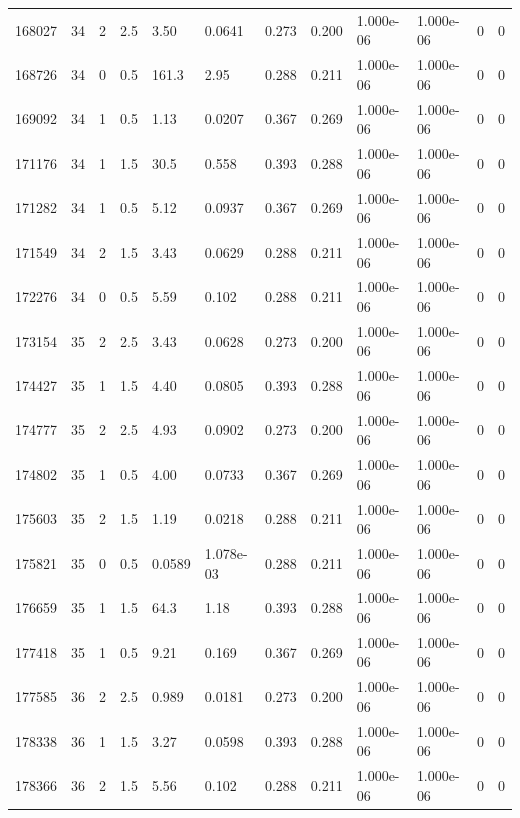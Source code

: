 \documentclass[preview]{standalone}
\begin{document}
{{{{{{{{\begin{tabular}{L{1.2cm}C{1.2cm} C{0.3cm}C{0.5cm} C{1.4cm}C{1.4cm} C{1.4cm}C{1.4cm} C{1.6cm}C{1.6cm} C{1.6cm}C{1.6cm}}
  168027  &    34  & 2     & 2.5 &  3.50  & 0.0641  &  0.273&   0.200& 1.000e-06 & 1.000e-06   &  0 & 0  \\ 
  168726  &    34  & 0     & 0.5 &  161.3  & 2.95  &  0.288&   0.211& 1.000e-06 & 1.000e-06   &  0 & 0  \\ 
  169092  &    34  & 1     & 0.5 &  1.13  & 0.0207  &  0.367&   0.269& 1.000e-06 & 1.000e-06   &  0 & 0  \\ 
  171176  &    34  & 1     & 1.5 &  30.5  & 0.558  &  0.393&   0.288& 1.000e-06 & 1.000e-06   &  0 & 0  \\ 
  171282  &    34  & 1     & 0.5 &  5.12  & 0.0937  &  0.367&   0.269& 1.000e-06 & 1.000e-06   &  0 & 0  \\ 
  171549  &    34  & 2     & 1.5 &  3.43  & 0.0629  &  0.288&   0.211& 1.000e-06 & 1.000e-06   &  0 & 0  \\ 
  172276  &    34  & 0     & 0.5 &  5.59  & 0.102  &  0.288&   0.211& 1.000e-06 & 1.000e-06   &  0 & 0  \\ 
  173154  &    35  & 2     & 2.5 &  3.43  & 0.0628  &  0.273&   0.200& 1.000e-06 & 1.000e-06   &  0 & 0  \\ 
  174427  &    35  & 1     & 1.5 &  4.40  & 0.0805  &  0.393&   0.288& 1.000e-06 & 1.000e-06   &  0 & 0  \\ 
  174777  &    35  & 2     & 2.5 &  4.93  & 0.0902  &  0.273&   0.200& 1.000e-06 & 1.000e-06   &  0 & 0  \\ 
  174802  &    35  & 1     & 0.5 &  4.00  & 0.0733  &  0.367&   0.269& 1.000e-06 & 1.000e-06   &  0 & 0  \\ 
  175603  &    35  & 2     & 1.5 &  1.19  & 0.0218  &  0.288&   0.211& 1.000e-06 & 1.000e-06   &  0 & 0  \\ 
  175821  &    35  & 0     & 0.5 &  0.0589  & 1.078e-03  &  0.288&   0.211& 1.000e-06 & 1.000e-06   &  0 & 0  \\ 
  176659  &    35  & 1     & 1.5 &  64.3  & 1.18  &  0.393&   0.288& 1.000e-06 & 1.000e-06   &  0 & 0  \\ 
  177418  &    35  & 1     & 0.5 &  9.21  & 0.169  &  0.367&   0.269& 1.000e-06 & 1.000e-06   &  0 & 0  \\ 
  177585  &    36  & 2     & 2.5 &  0.989  & 0.0181  &  0.273&   0.200& 1.000e-06 & 1.000e-06   &  0 & 0  \\ 
  178338  &    36  & 1     & 1.5 &  3.27  & 0.0598  &  0.393&   0.288& 1.000e-06 & 1.000e-06   &  0 & 0  \\ 
  178366  &    36  & 2     & 1.5 &  5.56  & 0.102  &  0.288&   0.211& 1.000e-06 & 1.000e-06   &  0 & 0  \\ 

\end{tabular}}}}}}}}}
\end{document}
